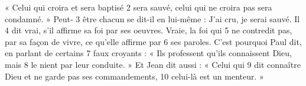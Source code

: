 « Celui qui croira et sera baptisé	 
2	 	sera sauvé, celui qui ne croira pas sera condamné. » Peut-	 
3	 	être chacun se dit-il en lui-même : J'ai cru, je serai sauvé. Il	 
4	 	dit vrai, s'il affirme sa foi par ses oeuvres. Vraie, la foi qui	 
5	 	ne contredit pas, par sa façon de vivre, ce qu'elle affirme par	 
6	 	ses paroles. C'est pourquoi Paul dit, en parlant de certains	 
7	 	faux croyants : « Ils professent qu'ils connaissent Dieu, mais	 
8	 	le nient par leur conduite. » Et Jean dit aussi : « Celui qui	 
9	 	dit connaître Dieu et ne garde pas ses commandements,	 
10	 	celui-là est un menteur. »